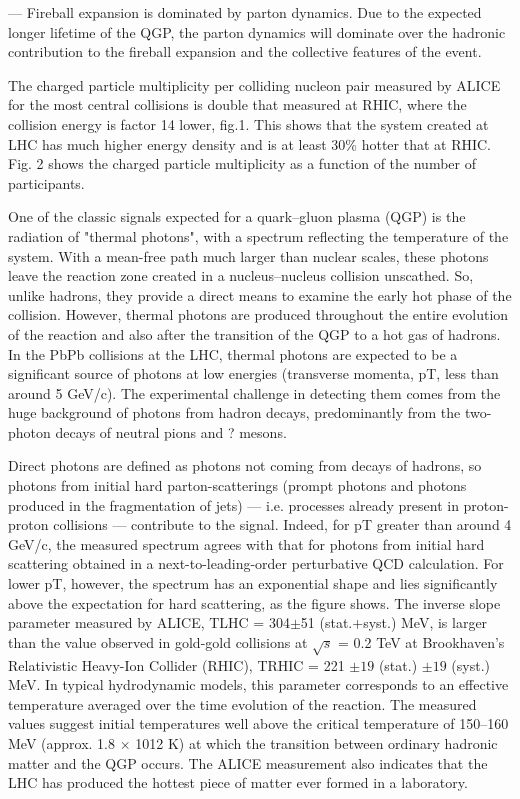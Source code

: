 --- Fireball expansion is dominated by parton dynamics.
Due to the expected longer lifetime of the QGP, the parton dynamics will dominate over the hadronic contribution to the fireball expansion and the collective features of the event.

The charged particle multiplicity per colliding nucleon pair measured by ALICE for the most central collisions is double that measured at RHIC, where the collision energy is factor 14 lower, fig.1. This shows that the system created at LHC has much higher energy density and is at least 30\% hotter that at RHIC. Fig. 2 shows the charged particle multiplicity as a function of the number of participants. 

One of the classic signals expected for a quark–gluon plasma (QGP) is the radiation of "thermal photons", with a spectrum reflecting the temperature of the system. With a mean-free path much larger than nuclear scales, these photons leave the reaction zone created in a nucleus–nucleus collision unscathed. So, unlike hadrons, they provide a direct means to examine the early hot phase of the collision. However, thermal photons are produced throughout the entire evolution of the reaction and also after the transition of the QGP to a hot gas of hadrons. In the PbPb collisions at the LHC, thermal photons are expected to be a significant source of photons at low energies (transverse momenta, pT, less than around 5 GeV/c). The experimental challenge in detecting them comes from the huge background of photons from hadron decays, predominantly from the two-photon decays of neutral pions and ? mesons. 

Direct photons are defined as photons not coming from decays of hadrons, so photons from initial hard parton-scatterings (prompt photons and photons produced in the fragmentation of jets) --- i.e. processes already present in proton-proton collisions --- contribute to the signal. Indeed, for pT greater than around 4 GeV/c, the measured spectrum agrees with that for photons from initial hard scattering obtained in a next-to-leading-order perturbative QCD calculation. For lower pT, however, the spectrum has an exponential shape and lies significantly above the expectation for hard scattering, as the figure shows. The inverse slope parameter measured by ALICE, TLHC = 304$\pm$51 (stat.+syst.) MeV, is larger than the value observed in gold-gold collisions at $\sqrt{s}$ = 0.2 TeV at Brookhaven’s Relativistic Heavy-Ion Collider (RHIC), TRHIC = 221 $\pm 19$ (stat.) $\pm 19$ (syst.) MeV. In typical hydrodynamic models, this parameter corresponds to an effective temperature averaged over the time evolution of the reaction. The measured values suggest initial temperatures well above the critical temperature of 150--160 MeV (approx. 1.8 $\times$ 1012 K) at which the transition between ordinary hadronic matter and the QGP occurs. The ALICE measurement also indicates that the LHC has produced the hottest piece of matter ever formed in a laboratory. 

